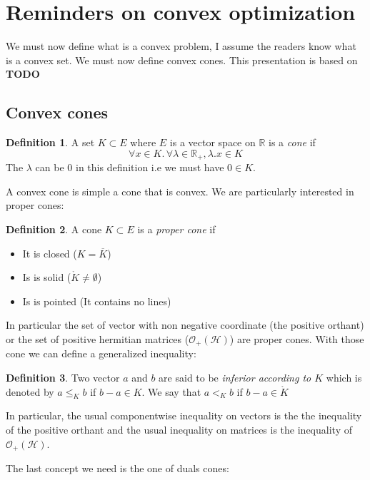 \documentclass[10pt]{report}
\theoremstyle{plain}
\theoremstyle{definition}
\newtheorem{defn}{Definition}[chapter]
\theoremstyle{remark}
\newcommand{\R}{\ensuremath{\mathbb{R}}}
\newcommand{\TODO}{\textbf{TODO}}
\renewcommand{\leq}{\leqslant}
\begin{document}
\section{Reminders on convex optimization}

We must now define what is a convex problem, I assume the readers know what is a
convex set. We must now define convex cones. This presentation is based on \TODO{}

\subsection{Convex cones}

\begin{defn}
  A set $K \subset E$ where $E$ is a vector space on $\R$ is a \emph{cone} if
  \[\forall x \in K.\, \forall \lambda \in \R_+, \lambda.x  \in K\]
  The $\lambda$ can be 0 in this definition i.e we must have $0 \in K$.
\end{defn}

A convex cone is simple a cone that is convex. We are particularly interested in
proper cones:

\begin{defn}
  A cone $K \subset E$ is a \emph{proper cone} if
  \begin{itemize}
    \item It is closed ($K = \overline K$)
    \item Is is solid ($ \mathring K \neq \emptyset$)
    \item Is is pointed (It contains no lines)
  \end{itemize}
\end{defn}

In particular the set of vector with non negative coordinate (the positive orthant) or the set of
positive hermitian matrices ($\mathcal{O}_+(\mathcal{H})$) are proper cones. With those cone we can define a
generalized inequality:

\begin{defn}
  Two vector $a$ and $b$ are said to be \emph{inferior according to $K$} which is denoted by $a
  \leq_K b$ if $b - a \in K$. We say that $a <_K b$ if $b - a \in \mathring K$
\end{defn}

In particular, the usual componentwise inequality on vectors is the the
inequality of the positive orthant and the usual inequality on matrices is the
inequality of $\mathcal{O}_+(\mathcal{H})$.

The last concept we need is the one of duals cones:
\end{document}
